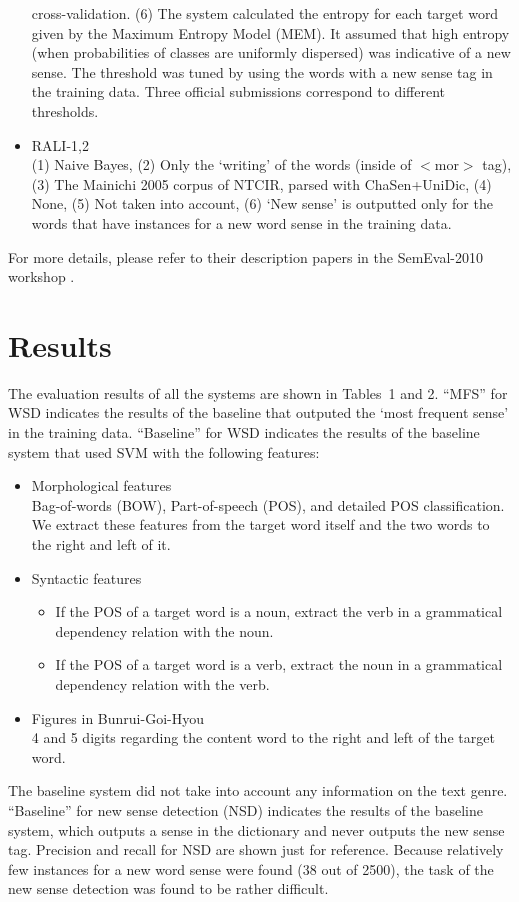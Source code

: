 \documentclass[english]{jnlp_1.4}
\begin{document}
\begin{itemize}
  cross-validation. (6) The system calculated the entropy for each target word
  given by the Maximum Entropy Model (MEM). It assumed that high
  entropy (when probabilities of classes are uniformly dispersed) was
  indicative of a new sense. The threshold was tuned by using the
  words with a new sense tag in the training data. Three official
  submissions correspond to different thresholds.
\item RALI-1,2\\
(1) Naive Bayes, (2) Only the `writing' of the words (inside of $<$mor$>$
tag), (3) The Mainichi 2005 corpus of NTCIR, parsed with ChaSen+UniDic,
(4) None, (5) Not taken into account, (6) `New sense' is
  outputted only for the words that have instances for a new word
  sense in the training data.
\end{itemize}
For more details, please refer to their description papers in the
SemEval-2010 workshop \cite{brosseau:10:a,shirai:10:a,fujita:10:a}.


\section{Results}
\label{sec:length}

The evaluation results of all the systems are shown in Tables~1 and
2. ``MFS'' for WSD indicates the results of the baseline that outputed
the `most frequent sense' in the training data.
``Baseline'' for WSD indicates the results of the baseline system
that used SVM with the following features:
\begin{itemize}
\item Morphological features\\
Bag-of-words (BOW), Part-of-speech (POS), and detailed POS
classification. We extract these features from the target word itself
and the two words to the right and left of it.
\item Syntactic features
\begin{itemize}
\item If the POS of a target word is a noun, extract the verb in a grammatical dependency
relation with the noun.
\item If the POS of a target word is a verb, extract the noun in a grammatical dependency
relation with the verb.
\end{itemize}
\item Figures in Bunrui-Goi-Hyou\\
4 and 5 digits regarding the content word to the right and left of the target
word. 
\end{itemize}
The baseline system did not take into account any information on the
text genre. ``Baseline'' for new sense detection (NSD) indicates the
results of the baseline system, which outputs a sense in the
dictionary and never outputs the new sense tag. Precision and recall
for NSD are shown just for reference.
Because relatively few instances for a new word sense were found (38 out of
2500), the task of the new sense detection was found to be rather difficult.
\end{document}
